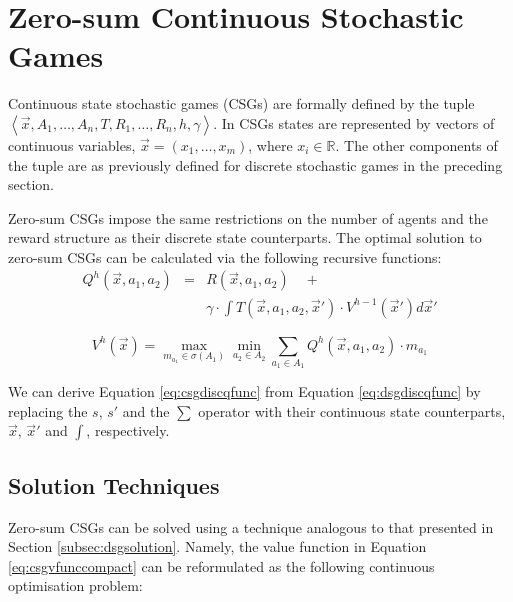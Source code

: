 \section{Zero-sum Continuous Stochastic Games}
\label{sec:csg}

Continuous state stochastic games (CSGs) are formally defined by the tuple
$ \left\langle \vec{x}, A_{1}, \ldots, A_{n}, T, R_{1}, \ldots, R_{n}, h, \gamma  \right\rangle$.
In CSGs states are represented by vectors of continuous variables, $\vec{x} = \left(x_1, \ldots, x_m \right)$, 
where $x_i \in \mathbb{R}$. The other components of the tuple are as 
previously defined for discrete stochastic games in the preceding section.

Zero-sum CSGs impose the same restrictions on the number of agents
and the reward structure as their discrete state counterparts. The 
optimal solution to zero-sum CSGs can be calculated via the 
following recursive functions:
{\small 
\begin{eqnarray}
\label{eq:csgdiscqfunc}
  Q^{h}(\vec{x}, a_1, a_2) &=& R(\vec{x}, a_1, a_2) \quad + \nonumber \\
  && \gamma \cdot \int T(\vec{x}, a_1, a_2, \vec{x}') \cdot V^{h-1}(\vec{x}') d\vec{x}' 
\end{eqnarray}
}%

{\small 
\begin{equation}
\label{eq:csgvfunccompact}
  V^{h}(\vec{x}) = \max_{m_{a_{1}} \in \sigma(A_1)} \min_{a_2 \in A_2} \sum_{a_1 \in A_1} Q^{h}(\vec{x}, a_1, a_2) \cdot m_{a_{1}}
\end{equation}
}%

We can derive Equation \eqref{eq:csgdiscqfunc} from Equation \eqref{eq:dsgdiscqfunc}
by replacing the $s$, $s'$ and the $\sum$ operator with their continuous
state counterparts, $\vec{x}$, $\vec{x}'$ and $\int$, respectively.
%

\subsection{Solution Techniques}

Zero-sum CSGs can be solved using a technique analogous to that 
presented in Section \ref{subsec:dsgsolution}. Namely, the value function in Equation
\eqref{eq:csgvfunccompact} can be reformulated as the following continuous 
optimisation problem:

